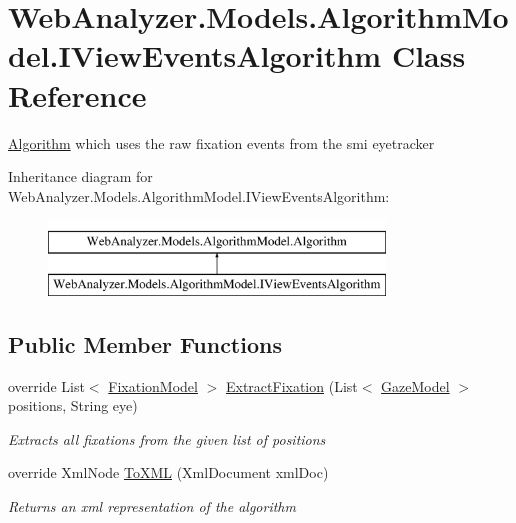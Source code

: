 \hypertarget{class_web_analyzer_1_1_models_1_1_algorithm_model_1_1_i_view_events_algorithm}{}\section{Web\+Analyzer.\+Models.\+Algorithm\+Model.\+I\+View\+Events\+Algorithm Class Reference}
\label{class_web_analyzer_1_1_models_1_1_algorithm_model_1_1_i_view_events_algorithm}


\hyperlink{class_web_analyzer_1_1_models_1_1_algorithm_model_1_1_algorithm}{Algorithm} which uses the raw fixation events from the smi eyetracker  


Inheritance diagram for Web\+Analyzer.\+Models.\+Algorithm\+Model.\+I\+View\+Events\+Algorithm\+:\begin{figure}[H]
\begin{center}
\leavevmode
\includegraphics[height=2.000000cm]{class_web_analyzer_1_1_models_1_1_algorithm_model_1_1_i_view_events_algorithm}
\end{center}
\end{figure}
\subsection*{Public Member Functions}
\begin{DoxyCompactItemize}
\item 
override List$<$ \hyperlink{class_web_analyzer_1_1_models_1_1_analysis_model_1_1_fixation_model}{Fixation\+Model} $>$ \hyperlink{class_web_analyzer_1_1_models_1_1_algorithm_model_1_1_i_view_events_algorithm_aff1e838e0f623dbbeb6d856bffbf4b27}{Extract\+Fixation} (List$<$ \hyperlink{class_web_analyzer_1_1_models_1_1_data_model_1_1_gaze_model}{Gaze\+Model} $>$ positions, String eye)
\begin{DoxyCompactList}\small\item\em Extracts all fixations from the given list of positions \end{DoxyCompactList}\item 
override Xml\+Node \hyperlink{class_web_analyzer_1_1_models_1_1_algorithm_model_1_1_i_view_events_algorithm_aaac2b9b4e6b08e6b6628155ca4f4da7e}{To\+X\+M\+L} (Xml\+Document xml\+Doc)
\begin{DoxyCompactList}\small\item\em Returns an xml representation of the algorithm \end{DoxyCompactList}\end{DoxyCompactItemize}
